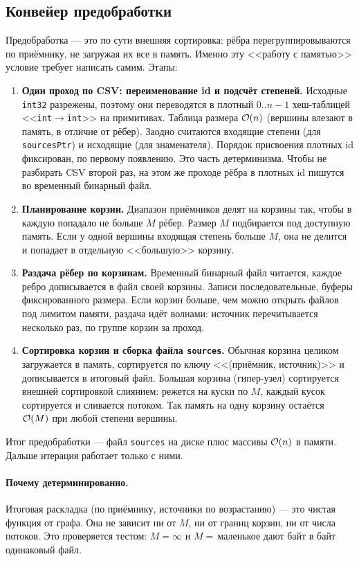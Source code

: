 \subsection{Конвейер предобработки}
\label{sec:preprocess}
Предобработка --- это по сути внешняя сортировка: рёбра перегруппировываются по приёмнику, не
загружая их все в память. Именно эту <<работу с памятью>> условие требует написать самим. Этапы:
\begin{enumerate}[itemsep=3pt]
  \item \textbf{Один проход по CSV: переименование id и подсчёт степеней.} Исходные \texttt{int32}
        разрежены, поэтому они переводятся в плотный $0..n{-}1$ хеш-таблицей
        <<\texttt{int}$\to$\texttt{int}>> на примитивах. Таблица размера $\mathcal{O}(n)$ (вершины влезают в
        память, в отличие от рёбер). Заодно считаются входящие степени (для \texttt{sourcesPtr}) и
        исходящие (для знаменателя). Порядок
        присвоения плотных id фиксирован, по первому появлению. Это часть детерминизма. Чтобы не
        разбирать CSV второй раз, на этом же проходе рёбра в плотных id пишутся во временный бинарный
        файл.
  \item \textbf{Планирование корзин.} Диапазон приёмников делят на корзины так, чтобы в каждую
        попадало не больше $M$ рёбер. Размер $M$ подбирается под доступную память. Если у одной
        вершины входящая степень больше $M$, она не делится и попадает в отдельную <<большую>> корзину.
  \item \textbf{Раздача рёбер по корзинам.} Временный бинарный файл читается, каждое ребро
        дописывается в файл своей корзины. Записи последовательные, буферы фиксированного размера.
        Если корзин больше, чем можно открыть файлов под лимитом памяти, раздача идёт волнами:
        источник перечитывается несколько раз, по группе корзин за проход.
  \item \textbf{Сортировка корзин и сборка файла \texttt{sources}.} Обычная корзина целиком
        загружается в память, сортируется по ключу <<(приёмник, источник)>> и дописывается в итоговый
        файл. Большая корзина (гипер-узел) сортируется внешней сортировкой слиянием: режется на куски
        по $M$, каждый кусок сортируется и сливается потоком. Так память на одну корзину остаётся
        $\mathcal{O}(M)$ при любой степени вершины.
\end{enumerate}

Итог предобработки --- файл \texttt{sources} на диске плюс массивы $\mathcal{O}(n)$ в памяти. Дальше
итерация работает только с ними.

\paragraph{Почему детерминированно.} Итоговая раскладка (по приёмнику, источники по возрастанию) ---
это чистая функция от графа. Она не зависит ни от $M$, ни от границ корзин, ни от числа потоков. Это
проверяется тестом: $M=\infty$ и $M=$\,маленькое дают байт в байт одинаковый файл.
